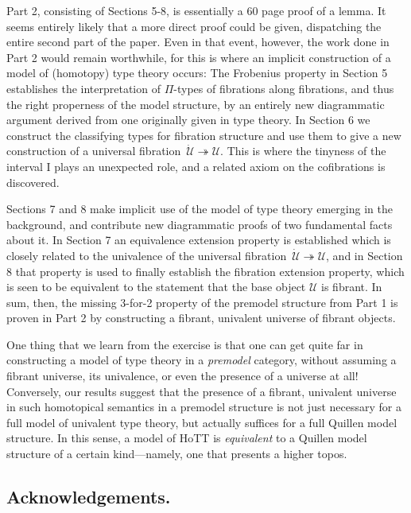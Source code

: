 \documentclass[11pt,reqno]{amsart}
\newcommand{\fib}{\ensuremath{\twoheadrightarrow}}
\newcommand{\I}{\ensuremath{\mathrm{I}}}
\newcommand{\U}{\ensuremath{\mathcal{U}}}
\newcommand{\UU}{\ensuremath{\,\dot{\mathcal{U}}}}
\theoremstyle{remark}
\theoremstyle{definition}
\begin{document}
Part 2, consisting of Sections 5-8, is essentially a 60 page proof of a lemma.  It seems entirely likely that a more direct proof could be given, dispatching the entire second part of the paper. Even in that event, however, the work done in Part 2 would remain worthwhile, for this is where an implicit construction of a model of (homotopy) type theory occurs: The Frobenius property in Section 5 establishes the interpretation of $\Pi$-types of fibrations along fibrations, and thus the right properness of the model structure, by an entirely new diagrammatic argument derived from one originally given in type theory.   In Section 6 we construct the classifying types for fibration structure and use them to give a new construction of a universal fibration $\UU\fib\U$.  This is where the tinyness of the interval $\I$ plays an unexpected role, and a related axiom on the cofibrations is discovered.

Sections 7 and 8 make implicit use of the model of type theory emerging in the background, and contribute new diagrammatic proofs of two fundamental facts about it.  In Section 7 an equivalence extension property is established which is closely related to the univalence of the universal fibration $\UU\fib\U$, and in Section 8 that property is used to finally establish the fibration extension property, which is seen to be equivalent to the statement that the base object $\U$ is fibrant.  In sum, then, the missing 3-for-2 property of the premodel structure from Part 1 is proven in Part 2 by constructing a fibrant, univalent universe of fibrant objects.

One thing that we learn from the exercise is that one can get quite far in constructing a model of type theory in a \emph{premodel} category,   without assuming a fibrant universe, its univalence, or even the presence of a universe at all!  Conversely, our results suggest that the presence of a fibrant, univalent universe in such homotopical semantics in a premodel structure is not just necessary for a full model of univalent type theory, but actually suffices for a full Quillen model structure. In this sense, a model of HoTT is \emph{equivalent} to a Quillen model structure of a certain kind---namely, one that presents a higher topos.

\subsection*{Acknowledgements.}
\end{document}
